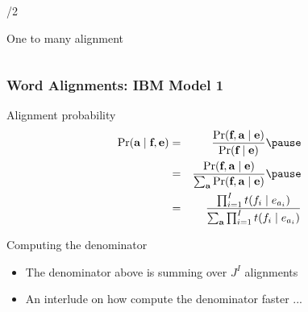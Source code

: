 \begin{frame}
\begin{columns}[t]
\begin{column}{\textwidth/2}
\begin{block}{One to many alignment \xmark}

\end{block}

\end{column}

\end{columns}

\end{frame}

\begin{frame}
\frametitle{Word Alignments: IBM Model 1}
\begin{block}{Alignment probability}
\begin{eqnarray*}
\Pr(\aln \mid \src, \tgt) & = & \frac{ \Pr( \src, \aln \mid \tgt ) }{ \Pr(\src \mid \tgt) } \pause\\
& = & \frac{ \Pr( \src, \aln \mid \tgt ) }{ \sum_{\aln} \Pr(\src, \aln \mid \tgt) } \pause\\
& = & \frac{ \prod_{i=1}^I t(f_i \mid e_{a_i}) }{ \sum_{\aln} \prod_{i=1}^I t(f_i \mid e_{a_i}) }
\end{eqnarray*}
\end{block}\pause 

\begin{block}{Computing the denominator}
\begin{itemize}
\item The denominator above is summing over $J^I$ alignments
\item An interlude on how compute the denominator faster ...
\end{itemize}

\end{block}

\end{frame}

